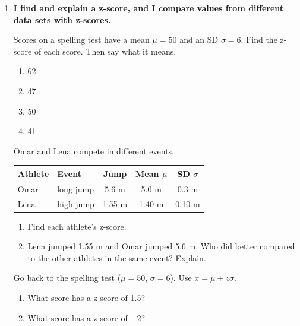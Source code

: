\documentclass[11pt]{article}
\newcommand{\goal}[1]{\textbf{#1}\par\vspace{0.35em}}
\begin{document}
\begin{enumerate}[resume]
\newpage
\item \goal{I find and explain a z-score, and I compare values from different data sets with z-scores.}
Scores on a spelling test have a mean $\mu = 50$ and an SD $\sigma = 6$. Find the z-score of each score. Then say what it means.
\begin{enumerate}[itemsep=1.2em]
  \item 62 
  \work{1.5em}
  \item 47 
  \work{1.5em}
  \item 50 
  \work{1.5em}
  \item 41 
  \work{1.5em}
\end{enumerate}

\vspace{0.6em}
Omar and Lena compete in different events.
\begin{center}
\renewcommand{\arraystretch}{1.3}
\begin{tabular}{|l|l|c|c|c|}\hline
Athlete & Event & Jump & Mean $\mu$ & SD $\sigma$ \\ \hline
Omar & long jump & 5.6 m & 5.0 m & 0.3 m \\ \hline
Lena & high jump & 1.55 m & 1.40 m & 0.10 m \\ \hline
\end{tabular}
\end{center}
\begin{enumerate}[start=5,itemsep=1.2em]
  \item Find each athlete's z-score.

  \work{3em}
  \item Lena jumped 1.55 m and Omar jumped 5.6 m. Who did better compared to the other athletes in the same event? Explain.

  \work{2.5em}
\end{enumerate}

\vspace{0.6em}
Go back to the spelling test ($\mu = 50$, $\sigma = 6$). Use $x = \mu + z\sigma$.
\begin{enumerate}[start=7,itemsep=1.2em]
  \item What score has a z-score of 1.5? 
  \work{1.5em}
  \item What score has a z-score of $-2$? 
\end{enumerate}

\end{enumerate}
\end{document}
